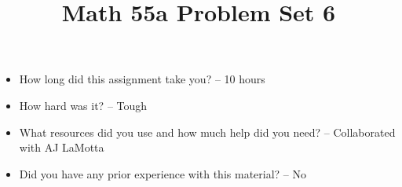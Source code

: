 \documentclass[11pt,letterpaper]{article}
\title{\textbf{Math 55a Problem Set 6}}
\begin{document}
\maketitle
\setcounter{page}{0}
\thispagestyle{empty}

\begin{itemize}
  \item How long did this assignment take you? -- 10 hours
  \item How hard was it? -- Tough
  \item What resources did you use and how much help did you need? -- Collaborated with AJ LaMotta
  \item Did you have any prior experience with this material? -- No
\end{itemize}

\pagebreak


\pagebreak


\pagebreak


\pagebreak


\pagebreak


\pagebreak


\pagebreak

\end{document}
